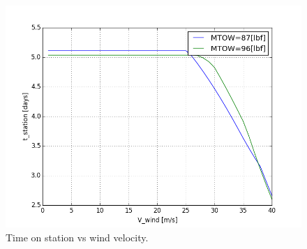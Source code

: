 \documentclass[10pt, a4paper]{article}
\begin{document}
\begin{figure}[h!]
\begin{center}
\includegraphics[scale = .6]{tvsV_wind96}
\caption{Time on station vs wind velocity. } 
\end{center}
\end{figure}
\end{document}
